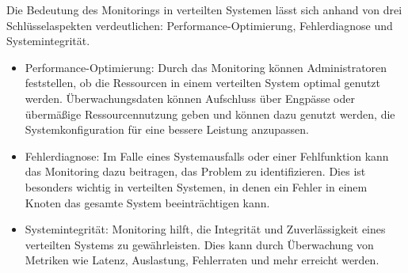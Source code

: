 Die Bedeutung des Monitorings in verteilten Systemen lässt sich anhand von drei Schlüsselaspekten verdeutlichen: Performance-Optimierung, Fehlerdiagnose und Systemintegrität.
\begin{itemize}
\item Performance-Optimierung: Durch das Monitoring können Administratoren feststellen, ob die Ressourcen in einem verteilten System optimal genutzt werden. Überwachungsdaten können Aufschluss über Engpässe oder übermäßige Ressourcennutzung geben und können dazu genutzt werden, die Systemkonfiguration für eine bessere Leistung anzupassen.
\item Fehlerdiagnose: Im Falle eines Systemausfalls oder einer Fehlfunktion kann das Monitoring dazu beitragen, das Problem zu identifizieren. Dies ist besonders wichtig in verteilten Systemen, in denen ein Fehler in einem Knoten das gesamte System beeinträchtigen kann.
\item Systemintegrität: Monitoring hilft, die Integrität und Zuverlässigkeit eines verteilten Systems zu gewährleisten. Dies kann durch Überwachung von Metriken wie Latenz, Auslastung, Fehlerraten und mehr erreicht werden.
\end{itemize}

